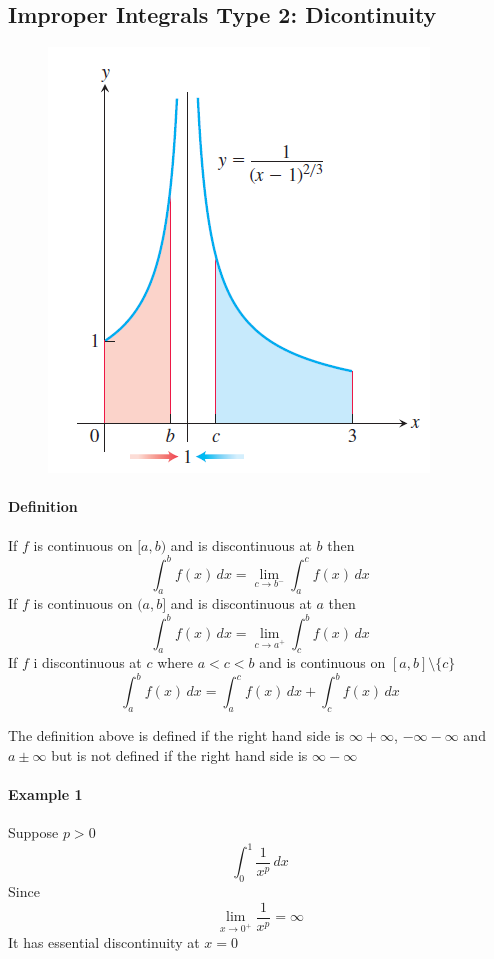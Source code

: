 \documentclass[12pt]{article}
\begin{document}
\subsection{Improper Integrals Type 2: Dicontinuity}
\begin{figure}[H]
    \centering
    \includegraphics[width = 0.35\linewidth]{Images/improper type 2.png}
\end{figure}
\paragraph{Definition}
If $f$ is continuous on $[a, b)$ and is discontinuous at $b$ then 
\[
    \int_a^b f(x) \, dx = \lim_{c \to b^{ - }} \int_a^c f(x) \, dx
\]
If $f$ is continuous on $(a, b]$ and is discontinuous at $a$ then 
\[
    \int_a^b f(x) \, dx = \lim_{c \to a^{ + }} \int_c^b f(x) \, dx
\]
If $f$ i discontinuous at $c$ where $a < c < b$ and is continuous on $[a, b] \setminus\{c\}$
\[
    \int_a^b f(x) \, dx = \int_a^c f(x) \, dx +\int_c^b f(x) \, dx
\]

The definition above is defined if the right hand side is $\infty + \infty$, $- \infty - \infty$ and $a \pm \infty$
but is not defined if the right hand side is $\infty - \infty$

\paragraph{Example 1} Suppose $p > 0$
\[
    \int_0^1 \frac{1}{x^p} \, dx
\]
Since 
\[
    \lim_{x \to 0^{ +}} \frac{1}{x^p} = \infty
\]
It has essential discontinuity at $x = 0$
\end{document}
